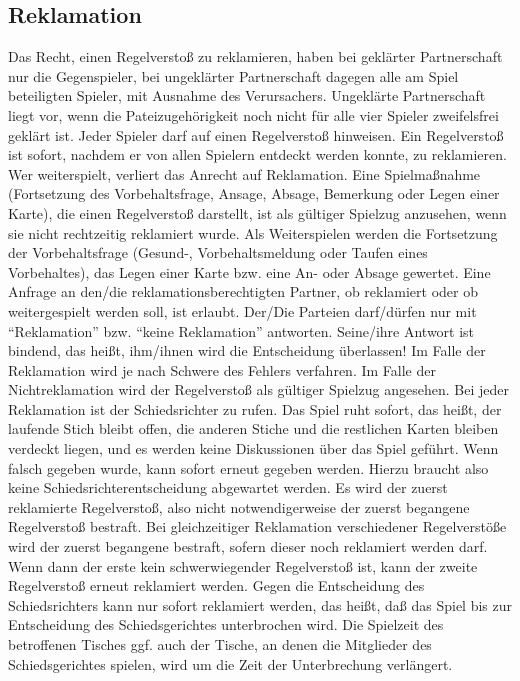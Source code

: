 \documentclass[12pt]{scrartcl}
\begin{document}
\subsection{Reklamation}
Das Recht, einen Regelverstoß zu reklamieren, haben bei
geklärter Partnerschaft nur die Gegenspieler, bei ungeklärter
Partnerschaft dagegen alle am Spiel beteiligten Spieler, mit
Ausnahme des Verursachers. Ungeklärte Partnerschaft liegt vor,
wenn die Pateizugehörigkeit noch nicht für alle vier Spieler
zweifelsfrei geklärt ist. Jeder Spieler darf auf einen
Regelverstoß hinweisen. Ein Regelverstoß ist sofort, nachdem er
von allen Spielern entdeckt werden konnte, zu reklamieren. Wer
weiterspielt, verliert das Anrecht auf Reklamation. Eine
Spielmaßnahme (Fortsetzung des Vorbehaltsfrage, Ansage, Absage,
Bemerkung oder Legen einer Karte), die einen Regelverstoß
darstellt, ist als gültiger Spielzug anzusehen, wenn sie nicht
rechtzeitig reklamiert wurde. Als Weiterspielen werden die
Fortsetzung der Vorbehaltsfrage (Gesund-, Vorbehaltsmeldung oder
Taufen eines Vorbehaltes), das Legen einer Karte bzw. eine An-
oder Absage gewertet. Eine Anfrage an den/die
reklamationsberechtigten Partner, ob reklamiert oder ob
weitergespielt werden soll, ist erlaubt. Der/Die Parteien
darf/dürfen nur mit "`Reklamation"' bzw. "`keine Reklamation"'
antworten. Seine/ihre Antwort ist bindend, das heißt, ihm/ihnen
wird die Entscheidung überlassen! Im Falle der Reklamation wird
je nach Schwere des Fehlers verfahren. Im Falle der
Nichtreklamation wird der Regelverstoß als gültiger Spielzug
angesehen. Bei jeder Reklamation ist der Schiedsrichter zu rufen.
Das Spiel ruht sofort, das heißt, der laufende Stich bleibt
offen, die anderen Stiche und die restlichen Karten bleiben
verdeckt liegen, und es werden keine Diskussionen über das Spiel
geführt. Wenn falsch gegeben wurde, kann sofort erneut gegeben
werden. Hierzu braucht also keine Schiedsrichterentscheidung
abgewartet werden. Es wird der zuerst reklamierte Regelverstoß,
also nicht notwendigerweise der zuerst begangene Regelverstoß
bestraft. Bei gleichzeitiger Reklamation verschiedener
Regelverstöße wird der zuerst begangene bestraft, sofern dieser
noch reklamiert werden darf. Wenn dann der erste kein
schwerwiegender Regelverstoß ist, kann der zweite Regelverstoß
erneut reklamiert werden. Gegen die Entscheidung des
Schiedsrichters kann nur sofort reklamiert werden, das heißt,
daß das Spiel bis zur Entscheidung des Schiedsgerichtes
unterbrochen wird. Die Spielzeit des betroffenen Tisches ggf.
auch der Tische, an denen die Mitglieder des Schiedsgerichtes
spielen, wird um die Zeit der Unterbrechung verlängert.
\end{document}
